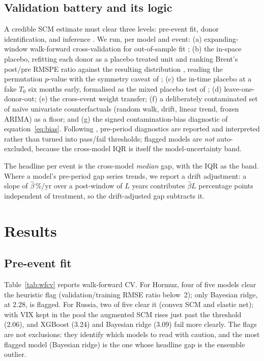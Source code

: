 \documentclass[11pt,a4paper]{article}
\begin{document}
\subsection{Validation battery and its logic}
A credible SCM estimate must clear three levels: pre-event fit, donor identification,
and inference \citep{abadie2021}. We run, per model and event: (a) expanding-window
walk-forward cross-validation for out-of-sample fit \citep{hyndman2018,bergmeir2012};
(b) the in-space placebo, refitting each donor as a placebo treated unit and ranking
Brent's post/pre RMSPE ratio against the resulting distribution \citep{abadie2010},
reading the permutation $p$-value with the symmetry caveat of \citet{hahnshi2017};
(c) the in-time placebo at a fake $T_0$ six months early, formalised as the mixed
placebo test of \citet{chenyan2023}; (d) leave-one-donor-out; (e) the cross-event weight
transfer; (f) a deliberately contaminated set of na\"ive univariate counterfactuals
(random walk, drift, linear trend, frozen ARIMA) as a floor; and (g) the signed
contamination-bias diagnostic of equation~\eqref{eq:bias}. Following
\citet{roth2022,rambachanroth2023}, pre-period diagnostics are reported and interpreted
rather than turned into pass/fail thresholds; flagged models are \emph{not} auto-excluded,
because the cross-model IQR is itself the model-uncertainty band.

The headline per event is the cross-model \emph{median} gap, with the IQR as the band.
Where a model's pre-period gap series trends, we report a drift adjustment: a slope of
$\hat\beta$\,\%/yr over a post-window of $L$ years contributes $\hat\beta L$ percentage
points independent of treatment, so the drift-adjusted gap subtracts it.

\section{Results}\label{sec:results}
\subsection{Pre-event fit}
Table~\ref{tab:wfcv} reports walk-forward CV. For Hormuz, four of five models clear the
heuristic flag (validation/training RMSE ratio below~2); only Bayesian ridge, at 2.28,
is flagged. For Russia, two of five clear it (convex SCM and elastic net); with VIX kept
in the pool the augmented SCM rises just past the threshold (2.06), and XGBoost (3.24)
and Bayesian ridge (3.09) fail more clearly. The flags are not exclusions: they identify
which models to read with caution, and the most flagged model (Bayesian ridge) is the one
whose headline gap is the ensemble outlier.
\end{document}
